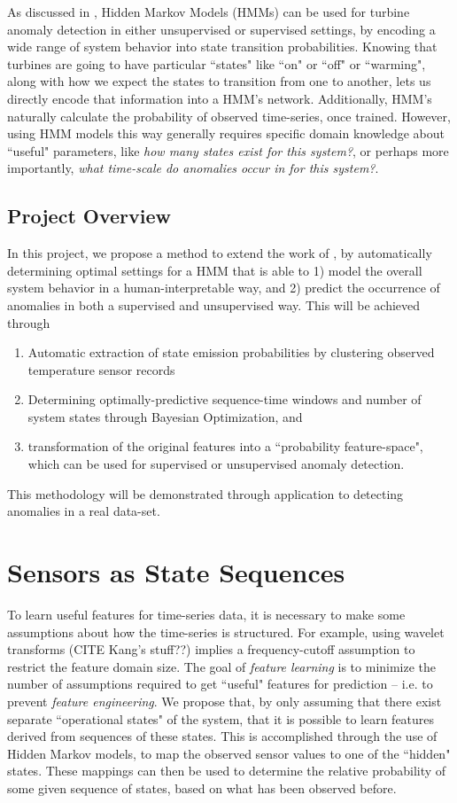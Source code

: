 \documentclass[twocolumn,10pt]{article}
\begin{document}
As discussed in \citet{gas_turbine}, Hidden Markov Models (HMMs) can be used for turbine anomaly detection in either unsupervised or supervised settings, by encoding a wide range of system behavior into state transition probabilities. Knowing that turbines are going to have particular ``states" like ``on" or ``off" or ``warming", along with how we expect the states to transition from one to another, lets us directly encode that information into a HMM's network. Additionally, HMM's naturally calculate the probability of observed time-series, once trained. However, using HMM models this way generally requires specific domain knowledge about ``useful" parameters, like \textit{how many states exist for this system?}, or perhaps more importantly, \textit{what time-scale do anomalies occur in for this system?}. 

\subsection{Project Overview}
In this project, we propose a method to extend the work of \citet{gas_turbine}, by automatically determining optimal settings for a HMM that is able to 1) model the overall system behavior in a human-interpretable way, and 2) predict the occurrence of anomalies in both a supervised and unsupervised way. 
This will be achieved through 
\begin{enumerate}
    \item Automatic extraction of state emission probabilities by clustering observed temperature sensor records
    \item Determining optimally-predictive sequence-time windows and number of system states through Bayesian Optimization, and
    \item transformation of the original features into a ``probability feature-space", which can be used for supervised or unsupervised anomaly detection. 
\end{enumerate}

This methodology will be demonstrated through application to detecting anomalies in a real data-set.

\section{Sensors as State Sequences}
To learn useful features for time-series data, it is necessary to make some assumptions about how the time-series is structured. For example, using wavelet transforms (CITE Kang's stuff??) implies a frequency-cutoff assumption to restrict the feature domain size. The goal of \textit{feature learning} is to minimize the number of assumptions required to get ``useful" features for prediction -- i.e. to prevent \textit{feature engineering}. We propose that, by only assuming that there exist separate ``operational states" of the system, that it is possible to learn features derived from sequences of these states. This is accomplished through the use of Hidden Markov models, to map the observed sensor values to one of the ``hidden" states. These mappings can then be used to determine the relative probability of some given sequence of states, based on what has been observed before.
\end{document}
